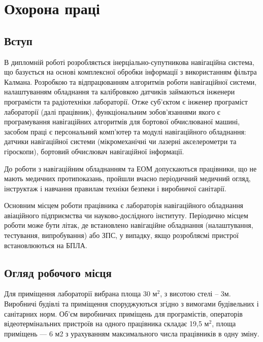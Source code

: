 \documentclass[ukrainian,utf8,simple,floatsubsection, hpadding=5mm,equationsubsection,]{eskdtext}
\begin{document}
\section{Охорона праці}
\subsection{Вступ}

В дипломній роботі розробляється інерціально-супутникова навігаційна система, що базується на основі комплексної обробки інформації з використанням фільтра Калмана. Розробкою та відпрацюванням алгоритмів роботи навігаційної системи, налаштуванням обладнання та калібровкою датчиків займаються інженери програмісти та радіотехніки лабораторії. Отже суб’єктом є інженер програміст лабораторії (далі працівник), функціональним зобов'язаннями якого є програмування навігаційних алгоритмів для бортової обчислюваної машині, засобом праці є персональний комп'ютер та модулі навігаційного обладнання: датчики навігаційної системи (мікромеханічні чи лазерні акселерометри та гіроскопи), бортовий обчислювач навігаційної інформації.

До роботи з навігаційним обладнанням та ЕОМ допускаються працівники, що не мають медичних протипоказань, пройшли вчасно періодичний медичний огляд, інструктаж і навчання  правилам техніки безпеки і виробничої санітарії.

Основним місцем роботи працівника є лабораторія навігаційного обладнання авіаційного підприємства чи науково-дослідного інституту. Періодично місцем роботи може бути літак, де встановлено навігаційне обладнання (налаштування, тестування, випробування) або ЗПС, у випадку, якщо розробляємі пристрої встановлюються на БПЛА.

\subsection{Огляд робочого місця}
Для приміщення лабораторії вибрана площа 30 $\text{м}^2$, з висотою стелі -- 3м. Виробничі будівлі та приміщення споруджуються згідно з вимогами будівельних і санітарних норм. Об’єм виробничих приміщень для програмістів, операторів відеотермінальних пристроїв на одного працівника складає 19,5 $\text{м}^2$, площа приміщень — 6 м2 з урахуванням максимального числа працівників в одну зміну. 
\end{document}
